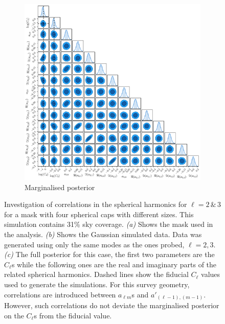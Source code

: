 \begin{figure}
\begin{subfigure}[b]{\textwidth}
 \includegraphics[width=\textwidth]{BPL-FIGS/Blob_fsky_01_trianglePlot.pdf}
  \caption{Marginalised posterior}
  \label{fig:BPL:BlobTriang}
\end{subfigure}
\caption[Investigation of correlation spherical harmonics for $\ell = 2\, \& \, 3$ for a mask with four spherical caps with different sizes containing a 10\% sky fraction]{Investigation of correlations in the spherical harmonics for $\ell = 2\, \& \, 3$ for a mask with four spherical caps with different sizes. This simulation contains 31\% sky coverage. \textit{(a)} Shows the mask used in the analysis. \textit{(b)} Shows the Gaussian simulated data. Data was generated using only the same modes as the ones probed, $\ell = 2,3$. \textit{(c)} The full posterior for this case, the first two parameters are the $C_{\ell}$s while the following ones are the real and imaginary parts of the related spherical harmonics. Dashed lines show the fiducial $C_{\ell}$ values used to generate the simulations. For this survey geometry, correlations are introduced between $a_{\ell m}$s and $a'_{(\ell-1),(m-1)}$. However, such correlations do not deviate the marginalised posterior on the $C_{\ell}$s from the fiducial value.}
\label{fig:BPL:Blob}
\end{figure}


